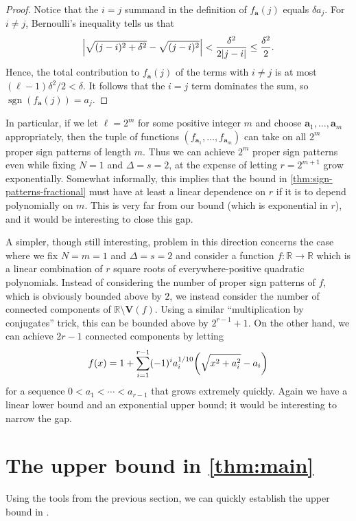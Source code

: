 \documentclass[11pt]{amsart}
\theoremstyle{definition}
\DeclarePairedDelimiter{\paren}{(}{)}
\DeclarePairedDelimiter{\abs}{\lvert}{\rvert}
\DeclareMathOperator{\sgn}{sgn}
\let\Vec\mathbf
\newcommand{\RR}{\mathbb{R}}
\newcommand{\VV}{\mathbf{V}}
\begin{document}
\begin{proof}
Notice that the $i=j$ summand in the definition of $f_{\Vec a}(j)$ equals $\delta a_j$.  For $i \neq j$, Bernoulli's inequality tells us that
\[\abs*{\sqrt{(j-i)^2 +\delta^2} - \sqrt{(j-i)^2}}<\frac{\delta^2}{2\abs{j-i}} \leq \frac{\delta^2}{2}.\]
Hence, the total contribution to $f_{\Vec a}(j)$ of the terms with $i \neq j$ is at most $(\ell-1) \delta^2/2<\delta$. It follows that the $i=j$ term dominates the sum, so $\sgn(f_{\Vec a}(j))=a_j$.
\end{proof}
In particular, if we let $\ell = 2^m$ for some positive integer $m$ and choose $\Vec a_1,\ldots,\Vec a_m$ appropriately, then the tuple of functions $(f_{\Vec a_1},\ldots,f_{\Vec a_m})$ can take on all $2^m$ proper sign patterns of length $m$. Thus we can achieve $2^m$ proper sign patterns even while fixing $N = 1$ and $\Delta = s = 2$, at the expense of letting $r = 2^{m+1}$ grow exponentially. Somewhat informally, this implies that the bound in \cref{thm:sign-patterns-fractional} must have at least a linear dependence on $r$ if it is to depend polynomially on $m$. This is very far from our bound (which is exponential in $r$), and it would be interesting to close this gap.

A simpler, though still interesting, problem in this direction concerns the case where we fix $N = m = 1$ and $\Delta = s = 2$ and consider a function $f \colon \RR \to \RR$ which is a linear combination of $r$ square roots of everywhere-positive quadratic polynomials. Instead of considering the number of proper sign patterns of $f$, which is obviously bounded above by $2$, we instead consider the number of connected components of $\RR \setminus \VV(f)$. Using a similar ``multiplication by conjugates'' trick, this can be bounded above by $2^{r-1} + 1$. On the other hand, we can achieve $2r-1$ connected components by letting
\[f(x) = 1 + \sum_{i=1}^{r-1} (-1)^i a_i^{1/10} \paren*{\sqrt{x^2 + a_i^2} - a_i}\]
for a sequence $0 < a_1 < \cdots < a_{r-1}$ that grows extremely quickly. Again we have a linear lower bound and an exponential upper bound; it would be interesting to narrow the gap.

\section{The upper bound in \texorpdfstring{\cref{thm:main}}{Theorem \ref{thm:main}}}\label{sec:upper}

Using the tools from the previous section, we can quickly establish the upper bound in .
\end{document}
